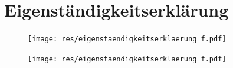 \documentclass[12pt,a4paper, english,twoside]{scrartcl}
\begin{document}
\section*{Eigenständigkeitserklärung}\label{sec:eigenstaendigkeit}
\begin{figure}[!b]
    \texttt{[image: res/eigenstaendigkeitserklaerung\_f.pdf]}
\end{figure}
\newpage
\begin{figure}[!b]
    \texttt{[image: res/eigenstaendigkeitserklaerung\_f.pdf]}
\end{figure}
%
\restoregeometry%
\end{document}
